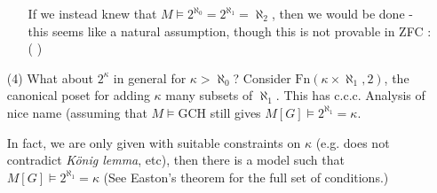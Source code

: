 \documentclass[12pt,a4paper]{article}
\begin{document}
\begin{itemize}
\begin{itemize}
\quad If we instead knew that $M\models 2^{\aleph_0} = 2^{\aleph_1} = \aleph_2$, then we would be done - this seems like a natural assumption, though this is not provable in ZFC :( ) 
\end{itemize}

\item[(4)] What about $2^{\kappa}$ in general for $\kappa > \aleph_0$? Consider $\text{Fn}(\kappa \times \aleph_1, 2)$, the canonical poset for adding $\kappa$ many subsets of $\aleph_1$. This has c.c.c. Analysis of nice name (assuming that $M\models \text{GCH}$ still gives $M[G] \models 2^{\aleph_1} = \kappa$.
\s

In fact, we are only given with suitable constraints on $\kappa$ (e.g. does not contradict \emph{K\"onig lemma}, etc), then there is a model such that $M[G] \models 2^{\aleph_1} = \kappa$ (See Easton's theorem for the full set of conditions.)
\end{itemize}
\end{document}
